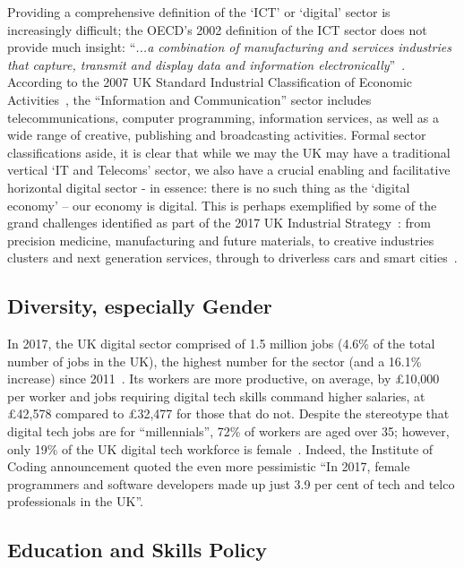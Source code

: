 \documentclass[sigconf,anonymous]{acmart}
\begin{document}
Providing a comprehensive definition of the `ICT' or `digital' sector
is increasingly difficult; the OECD's 2002 definition of the ICT
sector does not provide much insight: ``{\emph{...a combination of
manufacturing and services industries that capture, transmit and
display data and information
electronically}}''~\cite{oecd:2002}. According to the 2007 UK Standard
Industrial Classification of Economic Activities~\cite{onssic:2009},
the ``Information and Communication'' sector includes
telecommunications, computer programming, information services, as
well as a wide range of creative, publishing and broadcasting
activities. Formal sector classifications aside, it is clear that
while we may the UK may have a traditional vertical `IT and Telecoms'
sector, we also have a crucial enabling and facilitative horizontal
digital sector - in essence: there is no such thing as the `digital
economy' -- our economy is digital. This is perhaps exemplified by
some of the grand challenges identified as part of the 2017 UK
Industrial Strategy~\cite{ukis:2017}: from precision medicine,
manufacturing and future materials, to creative industries clusters
and next generation services, through to driverless cars and smart
cities~\cite{tryfonas+crick:petra2018}.

\subsection{Diversity, especially Gender}\label{sec:Gender}

In 2017, the UK digital sector comprised of 1.5 million jobs (4.6\% of
the total number of jobs in the UK), the highest number for the sector
(and a 16.1\% increase) since 2011~\cite{dcms:2017}. Its workers are
more productive, on average, by \pounds10,000 per worker and jobs
requiring digital tech skills command higher salaries, at
\pounds42,578 compared to \pounds32,477 for those that do not. Despite
the stereotype that digital tech jobs are for ``millennials'', 72\% of
workers are aged over 35; however, only 19\% of the UK digital tech
workforce is female~\cite{technation:2018}. Indeed, the Institute of
Coding announcement \cite{DfE2018a} quoted the even more pessimistic
``In 2017, female programmers and software developers made up just 3.9
per cent of tech and telco professionals in the UK''.

\subsection{Education and Skills Policy}
\end{document}
